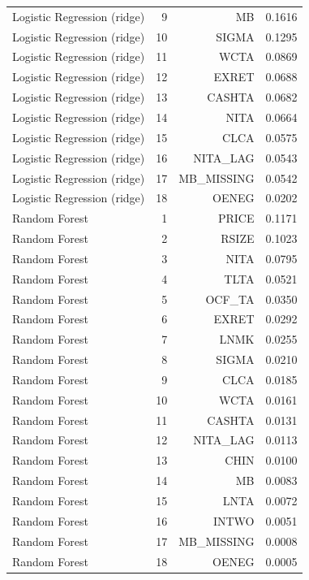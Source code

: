 \begin{table}[htbp]
\begin{tabular}{lrrr}
Logistic Regression (ridge) & 9 & MB & 0.1616 \\
Logistic Regression (ridge) & 10 & SIGMA & 0.1295 \\
Logistic Regression (ridge) & 11 & WCTA & 0.0869 \\
Logistic Regression (ridge) & 12 & EXRET & 0.0688 \\
Logistic Regression (ridge) & 13 & CASHTA & 0.0682 \\
Logistic Regression (ridge) & 14 & NITA & 0.0664 \\
Logistic Regression (ridge) & 15 & CLCA & 0.0575 \\
Logistic Regression (ridge) & 16 & NITA\_LAG & 0.0543 \\
Logistic Regression (ridge) & 17 & MB\_MISSING & 0.0542 \\
Logistic Regression (ridge) & 18 & OENEG & 0.0202 \\
Random Forest & 1 & PRICE & 0.1171 \\
Random Forest & 2 & RSIZE & 0.1023 \\
Random Forest & 3 & NITA & 0.0795 \\
Random Forest & 4 & TLTA & 0.0521 \\
Random Forest & 5 & OCF\_TA & 0.0350 \\
Random Forest & 6 & EXRET & 0.0292 \\
Random Forest & 7 & LNMK & 0.0255 \\
Random Forest & 8 & SIGMA & 0.0210 \\
Random Forest & 9 & CLCA & 0.0185 \\
Random Forest & 10 & WCTA & 0.0161 \\
Random Forest & 11 & CASHTA & 0.0131 \\
Random Forest & 12 & NITA\_LAG & 0.0113 \\
Random Forest & 13 & CHIN & 0.0100 \\
Random Forest & 14 & MB & 0.0083 \\
Random Forest & 15 & LNTA & 0.0072 \\
Random Forest & 16 & INTWO & 0.0051 \\
Random Forest & 17 & MB\_MISSING & 0.0008 \\
Random Forest & 18 & OENEG & 0.0005 \\
\bottomrule
\end{tabular}
\end{table}
